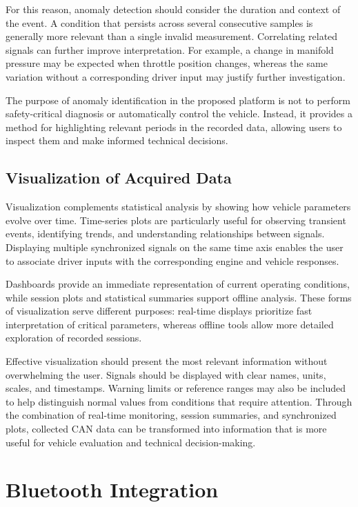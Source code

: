 For this reason, anomaly detection should consider the duration and context of the event. A condition that persists across several consecutive samples is generally more relevant than a single invalid measurement. Correlating related signals can further improve interpretation. For example, a change in manifold pressure may be expected when throttle position changes, whereas the same variation without a corresponding driver input may justify further investigation.

The purpose of anomaly identification in the proposed platform is not to perform safety-critical diagnosis or automatically control the vehicle. Instead, it provides a method for highlighting relevant periods in the recorded data, allowing users to inspect them and make informed technical decisions.

\subsection{Visualization of Acquired Data}

Visualization complements statistical analysis by showing how vehicle parameters evolve over time. Time-series plots are particularly useful for observing transient events, identifying trends, and understanding relationships between signals. Displaying multiple synchronized signals on the same time axis enables the user to associate driver inputs with the corresponding engine and vehicle responses.

Dashboards provide an immediate representation of current operating conditions, while session plots and statistical summaries support offline analysis. These forms of visualization serve different purposes: real-time displays prioritize fast interpretation of critical parameters, whereas offline tools allow more detailed exploration of recorded sessions.

Effective visualization should present the most relevant information without overwhelming the user. Signals should be displayed with clear names, units, scales, and timestamps. Warning limits or reference ranges may also be included to help distinguish normal values from conditions that require attention. Through the combination of real-time monitoring, session summaries, and synchronized plots, collected CAN data can be transformed into information that is more useful for vehicle evaluation and technical decision-making.

\section{Bluetooth Integration}

